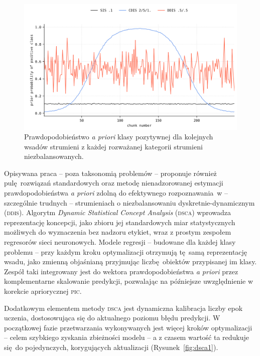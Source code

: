 \begin{figure}[!htb]
	\centering
	\includegraphics[width=\textwidth, clip=true]{figures/stream-taxonomy}
	\caption{Prawdopodobieństwo \emph{a priori} klasy pozytywnej dla kolejnych wsadów strumieni z każdej rozważanej kategorii strumieni niezbalansowanych.}\label{fig:stream-taxonomy}
\end{figure}

Opisywana praca -- poza taksonomią problemów -- proponuje również pulę rozwiązań standardowych oraz metodę nienadzorowanej estymacji prawdopodobieństwa \emph{a priori} zdolną do efektywnego rozpoznawania~w -- szczególnie trudnych -- strumieniach o niezbalansowaniu dyskretnie-dynamicznym (\textsc{ddis}). Algorytm \emph{Dynamic Statistical Concept Analysis} (\textsc{dsca}) wprowadza reprezentację koncepcji, jako zbioru jej standardowych miar statystycznych możliwych do wyznaczenia bez nadzoru etykiet, wraz z prostym zespołem regresorów sieci neuronowych. Modele regresji -- budowane dla każdej klasy problemu -- przy każdym kroku optymalizacji otrzymują tę samą reprezentację wsadu, jako zmienną objaśnianą przyjmując liczbę obiektów przypisanej im klasy. Zespół taki integrowany jest do wektora prawdopodobieństwa \emph{a priori} przez komplementarne skalowanie predykcji, pozwalając na późniejsze uwzględnienie w korekcie apriorycznej \textsc{pic}.

Dodatkowym elementem metody \textsc{dsca} jest dynamiczna kalibracja liczby epok uczenia, dostosowująca się do aktualnego poziomu błędu predykcji. W początkowej fazie przetwarzania wykonywanych jest więcej kroków optymalizacji -- celem szybkiego zyskania zbieżności modelu -- a z czasem wartość ta redukuje się do pojedynczych, korygujących aktualizacji (Rysunek~\ref{fig:dsca1}).

